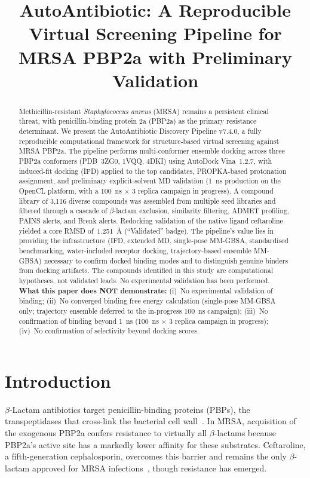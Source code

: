 \documentclass[12pt]{article}
\title{\textbf{AutoAntibiotic: A Reproducible Virtual Screening Pipeline for MRSA PBP2a with Preliminary Validation}}
\begin{document}
\maketitle

\begin{abstract}
Methicillin-resistant \textit{Staphylococcus aureus} (MRSA) remains a persistent clinical threat, with penicillin-binding protein 2a (PBP2a) as the primary resistance determinant. We present the AutoAntibiotic Discovery Pipeline v7.4.0, a fully reproducible computational framework for structure-based virtual screening against MRSA PBP2a. The pipeline performs multi-conformer ensemble docking across three PBP2a conformers (PDB~3ZG0, 1VQQ, 4DKI) using AutoDock Vina~1.2.7, with induced-fit docking (IFD) applied to the top candidates, PROPKA-based protonation assignment, and preliminary explicit-solvent MD validation (1~ns production on the OpenCL platform, with a 100~ns $\times$ 3 replica campaign in progress). A compound library of 3,116 diverse compounds was assembled from multiple seed libraries and filtered through a cascade of $\beta$-lactam exclusion, similarity filtering, ADMET profiling, PAINS alerts, and Brenk alerts. Redocking validation of the native ligand ceftaroline yielded a core RMSD of~\SI{1.251}{\angstrom} (``Validated'' badge). The pipeline's value lies in providing the infrastructure (IFD, extended MD, single-pose MM-GBSA, standardised benchmarking, water-included receptor docking, trajectory-based ensemble MM-GBSA) necessary to confirm docked binding modes and to distinguish genuine binders from docking artifacts. The compounds identified in this study are computational hypotheses, not validated leads. No experimental validation has been performed. \textbf{What this paper does NOT demonstrate:} (i)~No experimental validation of binding; (ii)~No converged binding free energy calculation (single-pose MM-GBSA only; trajectory ensemble deferred to the in-progress 100~ns campaign); (iii)~No confirmation of binding beyond 1~ns (100~ns $\times$ 3 replica campaign in progress); (iv)~No confirmation of selectivity beyond docking scores.
\end{abstract}

\section{Introduction}

$\beta$-Lactam antibiotics target penicillin-binding proteins (PBPs), the transpeptidases that cross-link the bacterial cell wall~\cite{fisher2005}. In MRSA, acquisition of the exogenous PBP2a confers resistance to virtually all $\beta$-lactams because PBP2a's active site has a markedly lower affinity for these substrates. Ceftaroline, a fifth-generation cephalosporin, overcomes this barrier and remains the only $\beta$-lactam approved for MRSA infections~\cite{zhanel2010}, though resistance has emerged.
\end{document}
